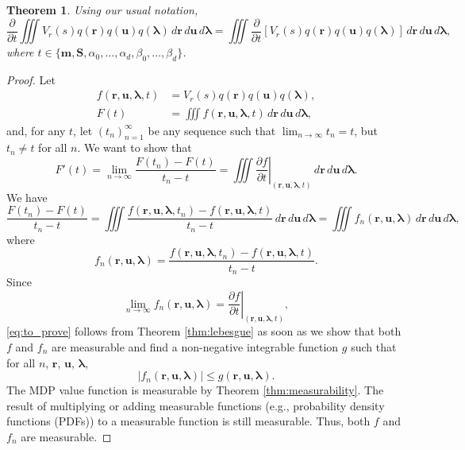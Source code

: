 \documentclass{article}
\newtheorem{theorem}{Theorem}
\theoremstyle{definition}
\newcommand{\dt}{\frac{\partial}{\partial t}}
\newcommand{\f}{f(\mathbf{r}, \mathbf{u}, \bm\lambda, t)}
\newcommand{\ftn}{f(\mathbf{r}, \mathbf{u}, \bm\lambda, t_n)}
\newcommand{\fn}{f_n(\mathbf{r}, \mathbf{u}, \bm\lambda)}
\newcommand{\dx}{\,d\mathbf{r}\,d\mathbf{u}\,d\bm\lambda}
\newcommand{\df}{\left.\frac{\partial f}{\partial t}\right|_{(\mathbf{r},
    \mathbf{u}, \bm\lambda, t)}}
\newcommand{\g}{g(\mathbf{r}, \mathbf{u}, \bm\lambda)}
\begin{document}
\begin{theorem}
  Using our usual notation,
  \[ \dt\iiint
    V_r(s)q(\mathbf{r})q(\mathbf{u})q(\bm\lambda)\dx
    = \iiint
    \dt[V_r(s)q(\mathbf{r})q(\mathbf{u})q(\bm\lambda)]\dx, \]
  where $t \in \{ \mathbf{m}, \mathbf{S}, \alpha_0, \dots, \alpha_d, \beta_0,
  \dots, \beta_d \}$.
\end{theorem}
\begin{proof}
  Let
  \begin{align*}
    \f &= V_r(s)q(\mathbf{r})q(\mathbf{u})q(\bm\lambda), \\
    F(t) &= \iiint \f\dx,
  \end{align*}
  and, for any $t$, let $(t_n)_{n=1}^\infty$ be any sequence such that
  $\lim_{n \to \infty} t_n = t$, but $t_n \ne t$ for all $n$. We want to show
  that
  \begin{equation} \label{eq:to_prove}
    F'(t) = \lim_{n \to \infty} \frac{F(t_n) - F(t)}{t_n - t} = \iiint \df\dx.
  \end{equation}
  We have
  \[ \frac{F(t_n) - F(t)}{t_n - t} = \iiint \frac{\ftn - \f}{t_n - t}\dx =
    \iiint \fn\dx, \]
  where
  \[ \fn = \frac{\ftn - \f}{t_n - t}. \]
  Since
  \[ \lim_{n \to \infty} \fn = \df, \]
  \eqref{eq:to_prove} follows from Theorem \ref{thm:lebesgue} as soon as we show
  that both $f$ and $f_n$ are measurable and find a non-negative integrable
  function $g$ such that for all $n$, $\mathbf{r}$, $\mathbf{u}$, $\bm\lambda$,
  \[ |\fn| \le \g. \]
  The MDP value function is measurable by Theorem \ref{thm:measurability}. The
  result of multiplying or adding measurable functions (e.g., probability
  density functions (PDFs)) to a measurable function is still measurable. Thus,
  both $f$ and $f_n$ are measurable.


\end{proof}
\end{document}
